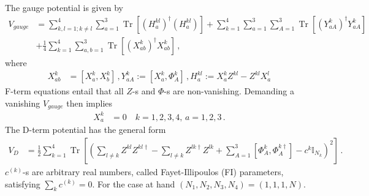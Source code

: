 \documentclass[12pt,a4paper]{JHEP3}
\newcommand{\Tr}{\mathop{\mathrm{Tr}}}
\begin{document}
The gauge potential is given by
\begin{align}
\nonumber
V_{gauge} &= \sum_{k,l=1; k\neq l}^4 \sum_{a=1}^3 \Tr{} \left[ \left( H^{kl}_a \right)^\dagger \left( H^{kl}_a \right) \right] + \sum_{k=1}^4 \sum_{a=1}^3 \sum_{A=1}^3 \Tr{} \left[ \left( Y^{k}_{aA} \right)^\dagger Y^{k}_{aA} \right] \\
\nonumber
&+ \frac{1}{4} \sum_{k=1}^4 \sum_{a,b=1}^3 \Tr{} \left[ \left( X^{k}_{ab} \right)^\dagger X^{k}_{ab}  \right] \, , 
\end{align}
where
\begin{align}
X^{k}_{ab} &= [X^{k}_a, X^{k}_b]\, , %
Y^{k}_{aA} := [X^{k}_a,\Phi^{k}_A] \, , H^{kl}_a := X_a^{k} Z^{kl} - Z^{kl} X_a^{l} 
\end{align}
F-term equations entail that all $Z$-s and $\Phi$-s are non-vanishing. Demanding a vanishing $V_{gauge}$ then implies
\begin{align}
X^{k}_a&= 0 \quad k=1,2,3,4, \, a=1,2,3 \, .
\end{align}
The D-term potential has the general form
\begin{align}
V_D &= \frac{1}{2} \sum_{k=1}^4 \Tr{} \left[ \left( \sum_{l \neq k} Z^{kl} Z^{kl \dagger} -  \sum_{l \neq k} Z^{lk \dagger} Z^{lk} + \sum_{A=1}^3 \left[ \Phi^{k}_A, \Phi^{k\dagger}_A \right] - c^{k} \mathbb{I}_{N_k} \right)^2 \right] \, .
\end{align}
%
$c^{(k)}$-s are arbitrary real numbers, called Fayet-Illipoulos (FI) parameters,  satisfying $\sum_k c^{(k)}=0$. For the case at hand $(N_1, N_2, N_3, N_4) = (1,1,1,N)$.
\end{document}
